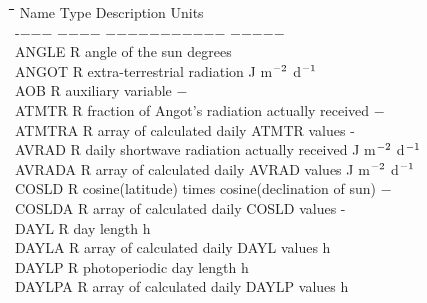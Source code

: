 \documentclass[11pt]{article}
\begin{document}
\begin{tabbing}
\hspace{1.27cm}\=\hspace{1.27cm}\=\hspace{1.27cm}\=\hspace{1.27cm}\=%
\hspace{1.27cm}\=\hspace{1.27cm}\=\hspace{1.27cm}\=\hspace{1.27cm}\=%
\hspace{1.27cm}\=\hspace{1.27cm}\=\kill
Name    \> \> Type\> Description                    \> \> \> \> \>    \> \> Units\\
-$-$$-$$-$    \> \> $-$$-$$-$$-$\> $-$$-$$-$$-$$-$$-$$-$$-$$-$$-$$-$                \> \> \>           \> \> \> \> $-$$-$$-$$-$$-$\\
ANGLE   \> \> R   \> angle of the sun                          \> \> \> \> \> \> \> degrees\\
ANGOT\> \> R\> extra-terrestrial radiation\> \> \> \> \> \> \> J m$^{{\rm -2}}$ d$^{{\rm -1}}$\\
AOB     \> \> R\> auxiliary variable                            \> \> \> \> \> \> \> $-$\\
ATMTR   \> \> R   \> fraction of Angot's radiation actually received    \> \> \> \> \> \> \> $-$\\
ATMTRA\> \> R\> array of calculated daily ATMTR values\> \> \> \> \> \> \> -\\
AVRAD\> \> R\> daily shortwave radiation actually received\> \> \> \> \> \> \> J m$^{{\rm -2}}$ d$^{{\rm -1}}$\\
AVRADA\> \> R\> array of calculated daily AVRAD values\> \> \> \> \> \> \> J m$^{{\rm -2}}$ d$^{{\rm -1}}$\\
COSLD   \> \> R  \> cosine(latitude) times cosine(declination of sun)\> \> \> \> \> \> \> $-$\\
COSLDA\> \> R\> array of calculated daily COSLD values\> \> \> \> \> \> \> -\\
DAYL \> \> R \> day length                              \> \> \> \> \> \> \> h\\
DAYLA\> \> R\> array of calculated daily DAYL values\> \> \> \> \> \> \> h\\
DAYLP   \> \> R \> photoperiodic day length                 \> \> \> \> \> \> \> h\\
DAYLPA\> \> R\> array of calculated daily DAYLP values\> \> \> \> \> \> \> h\\
$$
\end{tabbing}
\end{document}
